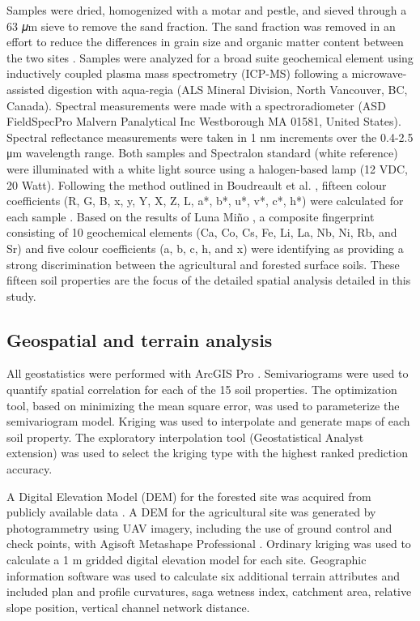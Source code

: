 \documentclass[
  number]{elsarticle}
\begin{document}
Samples were dried, homogenized with a motar and pestle, and sieved
through a 63 𝜇m sieve to remove the sand fraction. The sand fraction was
removed in an effort to reduce the differences in grain size and organic
matter content between the two sites \citep{laceby2017}. Samples were
analyzed for a broad suite geochemical element using inductively coupled
plasma mass spectrometry (ICP-MS) following a microwave-assisted
digestion with aqua-regia (ALS Mineral Division, North Vancouver, BC,
Canada). Spectral measurements were made with a spectroradiometer (ASD
FieldSpecPro Malvern Panalytical Inc Westborough MA 01581, United
States). Spectral reflectance measurements were taken in 1 nm increments
over the 0.4-2.5 μm wavelength range. Both samples and Spectralon
standard (white reference) were illuminated with a white light source
using a halogen-based lamp (12 VDC, 20 Watt). Following the method
outlined in Boudreault et al. \citep{boudreault2018}, fifteen colour
coefficients (R, G, B, x, y, Y, X, Z, L, a*, b*, u*, v*, c*, h*) were
calculated for each sample \citep{koiter2021}. Based on the results of
Luna Miño \citep{lunamiño2024}, a composite fingerprint consisting of 10
geochemical elements (Ca, Co, Cs, Fe, Li, La, Nb, Ni, Rb, and Sr) and
five colour coefficients (a, b, c, h, and x) were identifying as
providing a strong discrimination between the agricultural and forested
surface soils. These fifteen soil properties are the focus of the
detailed spatial analysis detailed in this study.

\subsection{Geospatial and terrain
analysis}\label{geospatial-and-terrain-analysis}

All geostatistics were performed with ArcGIS Pro \citep[v
3.3.0][]{esri2024}. Semivariograms were used to quantify spatial
correlation for each of the 15 soil properties. The optimization tool,
based on minimizing the mean square error, was used to parameterize the
semivariogram model. Kriging was used to interpolate and generate maps
of each soil property. The exploratory interpolation tool
(Geostatistical Analyst extension) was used to select the kriging type
with the highest ranked prediction accuracy.

A Digital Elevation Model (DEM) for the forested site was acquired from
publicly available data \citep{naturalresourcescanada2024}. A DEM for
the agricultural site was generated by photogrammetry using UAV imagery,
including the use of ground control and check points, with Agisoft
Metashape Professional \citep[v1.8.2][]{agisoft2021}. Ordinary kriging
was used to calculate a 1 m gridded digital elevation model for each
site. Geographic information software \citep[SAGA v2.1.4][]{conrad2015}
was used to calculate six additional terrain attributes and included
plan and profile curvatures, saga wetness index, catchment area,
relative slope position, vertical channel network distance.
\end{document}
